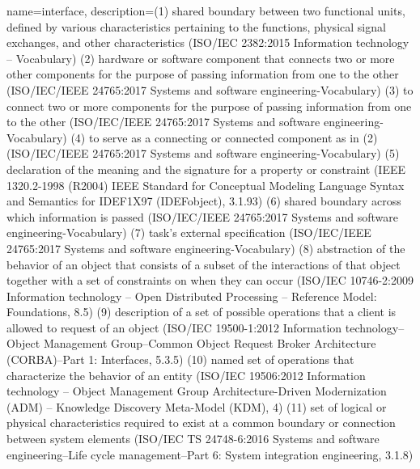 {
    name={interface},
    description={(1) shared boundary between two functional units, defined by various characteristics pertaining to the functions, physical signal exchanges, and other characteristics (ISO/IEC 2382:2015 Information technology -- Vocabulary) (2) hardware or software component that connects two or more other components for the purpose of passing information from one to the other (ISO/IEC/IEEE 24765:2017 Systems and software engineering-Vocabulary) (3) to connect two or more components for the purpose of passing information from one to the other (ISO/IEC/IEEE 24765:2017 Systems and software engineering-Vocabulary) (4) to serve as a connecting or connected component as in (2) (ISO/IEC/IEEE 24765:2017 Systems and software engineering-Vocabulary) (5) declaration of the meaning and the signature for a property or constraint (IEEE 1320.2-1998 (R2004) IEEE Standard for Conceptual Modeling Language Syntax and Semantics for IDEF1X97 (IDEFobject), 3.1.93) (6) shared boundary across which information is passed (ISO/IEC/IEEE 24765:2017 Systems and software engineering-Vocabulary) (7) task's external specification (ISO/IEC/IEEE 24765:2017 Systems and software engineering-Vocabulary) (8) abstraction of the behavior of an object that consists of a subset of the interactions of that object together with a set of constraints on when they can occur (ISO/IEC 10746-2:2009 Information technology -- Open Distributed Processing -- Reference Model: Foundations, 8.5) (9) description of a set of possible operations that a client is allowed to request of an object (ISO/IEC 19500-1:2012 Information technology-- Object Management Group--Common Object Request Broker Architecture (CORBA)--Part 1: Interfaces, 5.3.5) (10) named set of operations that characterize the behavior of an entity (ISO/IEC 19506:2012 Information technology -- Object Management Group Architecture-Driven Modernization (ADM) -- Knowledge Discovery Meta-Model (KDM), 4) (11) set of logical or physical characteristics required to exist at a common boundary or connection between system elements (ISO/IEC TS 24748-6:2016 Systems and software engineering--Life cycle management--Part 6: System integration engineering, 3.1.8)}
}

